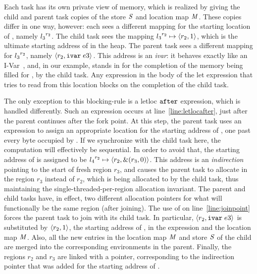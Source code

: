 \documentclass[acmsmall,acmthm=false,nonacm]{acmart}
\theoremstyle{straighttext0}
\theoremstyle{straighttext}
\begin{document}
Each task has its own private view of memory, which is realized by
giving the child and parent task copies of the store $\mathit{S}$ and
location map $\mathit{M}$.
%
These copies differ in one way, however: each sees a different mapping
for the starting location of , namely ${l_3}^{r_2}$.
%
The child task sees the mapping
${l_3}^{r_2} \mapsto \langle r_2, 1 \rangle ^{}$, which
is the ultimate starting address of  in the heap.
%
The parent task sees a different mapping for ${l_3}^{r_2}$,
namely $\langle r_2, \texttt{ivar}\; e3 \rangle ^{}$.
%
This address is an \emph{ivar}: it behaves exactly like an I-Var~\cite{IStructures},
and, in our example, stands in for the completion of the memory being
filled for , by the child task.
%
Any expression in the body of the let expression that tries to read
from this location blocks on the completion of the child task.


The only exception to this blocking-rule is a letloc $\texttt{after}$ expression, which is handled differently.
%
Such an expression occurs at line~\ref{line:letlocafter},
just after the parent continues after the fork point.
%
At this step, the parent task uses an  expression to
assign an appropriate location for the starting address of ,
one past every byte occupied by .
%
If we synchronize with the child task here, the computation will effectively be
sequential.
%
In order to avoid that,
the starting address of  is assigned to be
${l_4}^{r_2} \mapsto \langle r_2, \text{\&}(r_3,0) \rangle ^{}$.
%
This address is an \emph{indirection} pointing to the start of fresh region $r_3$, and
causes the parent task to allocate  in the region $r_3$ instead of $r_2$,
which is being allocated to by the child task,
thus maintaining the single-threaded-per-region allocation invariant.
%
The parent and child tasks have, in effect, two different
allocation pointers for 
what will functionally be the same region (after joining).
%
The use of  on line~\ref{line:joinpoint} forces the parent task
to join with its child task.
%
In particular,
$\langle r_2, \texttt{ivar}\; e3 \rangle ^{}$ is
substituted by $\langle r_2, 1 \rangle ^{}$, the starting address of
, in the expression and the location map $\mathit{M}$.
%
Also, all the new entries in the location map $\mathit{M}$ and store
$\mathit{S}$ of the child are merged into the corresponding environments in
the parent.
%
Finally, the regions $r_2$ and $r_3$ are linked with a pointer,
corresponding to the indirection pointer that was added for the starting address of .
\end{document}
